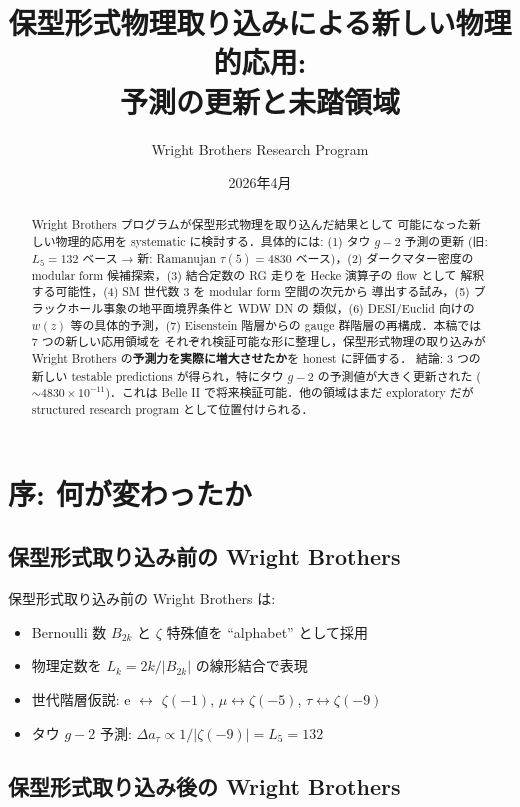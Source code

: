\documentclass[11pt,a4paper]{article}
\title{保型形式物理取り込みによる新しい物理的応用:\\
予測の更新と未踏領域}
\author{Wright Brothers Research Program}
\date{2026年4月}
\begin{document}
\maketitle

\begin{abstract}
Wright Brothers プログラムが保型形式物理を取り込んだ結果として
可能になった新しい物理的応用を systematic に検討する．具体的には:
(1) タウ $g-2$ 予測の更新 (旧: $L_5 = 132$ ベース → 新: Ramanujan
$\tau(5) = 4830$ ベース)，(2) ダークマター密度の modular form
候補探索，(3) 結合定数の RG 走りを Hecke 演算子の flow として
解釈する可能性，(4) SM 世代数 $3$ を modular form 空間の次元から
導出する試み，(5) ブラックホール事象の地平面境界条件と WDW DN の
類似，(6) DESI/Euclid 向けの $w(z)$ 等の具体的予測，(7) Eisenstein
階層からの gauge 群階層の再構成．本稿では 7 つの新しい応用領域を
それぞれ検証可能な形に整理し，保型形式物理の取り込みが Wright
Brothers の\textbf{予測力を実際に増大させたか}を honest に評価する．
結論: 3 つの新しい testable predictions が得られ，特にタウ $g-2$
の予測値が大きく更新された ($\sim 4830 \times 10^{-11}$)．これは
Belle II で将来検証可能．他の領域はまだ exploratory だが structured
research program として位置付けられる．
\end{abstract}

\tableofcontents

\newpage
\section{序: 何が変わったか}

\subsection{保型形式取り込み前の Wright Brothers}

保型形式取り込み前の Wright Brothers は:
\begin{itemize}
\item Bernoulli 数 $B_{2k}$ と $\zeta$ 特殊値を ``alphabet'' として採用
\item 物理定数を $L_k = 2k/|B_{2k}|$ の線形結合で表現
\item 世代階層仮説: e $\leftrightarrow$ $\zeta(-1)$, $\mu \leftrightarrow \zeta(-5)$,
$\tau \leftrightarrow \zeta(-9)$
\item タウ $g-2$ 予測: $\Delta a_\tau \propto 1/|\zeta(-9)| = L_5 = 132$
\end{itemize}

\subsection{保型形式取り込み後の Wright Brothers}
\end{document}
